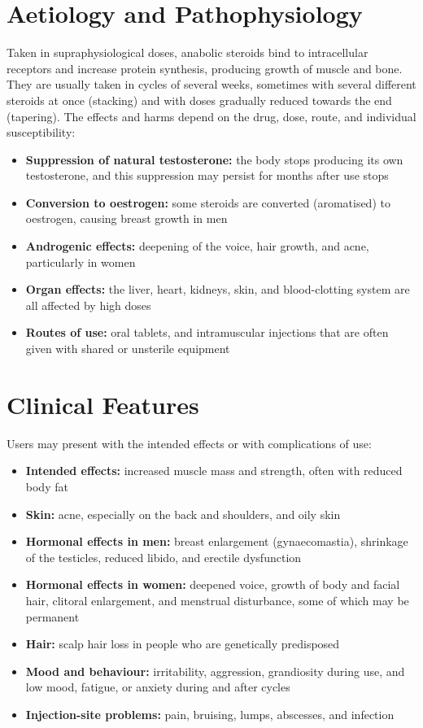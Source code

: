 \section*{Aetiology and Pathophysiology}
Taken in supraphysiological doses, anabolic steroids bind to intracellular receptors and increase protein synthesis, producing growth of muscle and bone. They are usually taken in cycles of several weeks, sometimes with several different steroids at once (stacking) and with doses gradually reduced towards the end (tapering). The effects and harms depend on the drug, dose, route, and individual susceptibility:
\begin{itemize}
    \item \textbf{Suppression of natural testosterone:} the body stops producing its own testosterone, and this suppression may persist for months after use stops
    \item \textbf{Conversion to oestrogen:} some steroids are converted (aromatised) to oestrogen, causing breast growth in men
    \item \textbf{Androgenic effects:} deepening of the voice, hair growth, and acne, particularly in women
    \item \textbf{Organ effects:} the liver, heart, kidneys, skin, and blood-clotting system are all affected by high doses
    \item \textbf{Routes of use:} oral tablets, and intramuscular injections that are often given with shared or unsterile equipment
\end{itemize}

\section*{Clinical Features}
Users may present with the intended effects or with complications of use:
\begin{itemize}
    \item \textbf{Intended effects:} increased muscle mass and strength, often with reduced body fat
    \item \textbf{Skin:} acne, especially on the back and shoulders, and oily skin
    \item \textbf{Hormonal effects in men:} breast enlargement (gynaecomastia), shrinkage of the testicles, reduced libido, and erectile dysfunction
    \item \textbf{Hormonal effects in women:} deepened voice, growth of body and facial hair, clitoral enlargement, and menstrual disturbance, some of which may be permanent
    \item \textbf{Hair:} scalp hair loss in people who are genetically predisposed
    \item \textbf{Mood and behaviour:} irritability, aggression, grandiosity during use, and low mood, fatigue, or anxiety during and after cycles
    \item \textbf{Injection-site problems:} pain, bruising, lumps, abscesses, and infection
\end{itemize}


